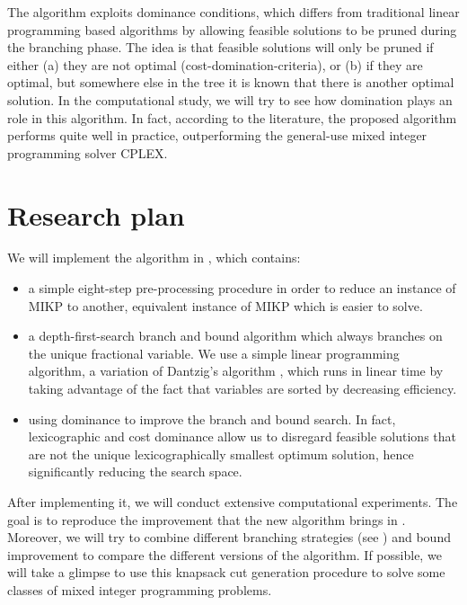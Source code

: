 \documentclass[a4paper,11pt]{article}
\begin{document}
The algorithm exploits dominance conditions, which differs from traditional linear programming based algorithms by allowing feasible 
solutions to be pruned during the branching phase. The idea is that feasible solutions will only be pruned if either (a) they are not 
optimal (cost-domination-criteria), or (b) if they are optimal, but somewhere else in the tree it is known that there is another optimal 
solution. In the computational study, we will try to see how  domination plays an role in this algorithm. In fact, according to the literature, the 
proposed algorithm performs quite well in practice, outperforming the general-use mixed integer programming solver CPLEX. 


\section{Research plan}
We will implement the algorithm in \cite{fukasawa2011exact}, which contains:
\begin{itemize}
\item a simple eight-step pre-processing procedure in order to reduce an instance of MIKP to another, equivalent
instance of MIKP which is easier to solve.
\item a depth-first-search branch and bound algorithm which always branches on the unique fractional variable. We use a simple 
linear programming algorithm, a variation of Dantzig’s algorithm \cite{dantzig1957discrete}, which runs in linear time by taking advantage 
of the fact that variables are sorted by decreasing efficiency.
\item using dominance to improve the branch and bound search. In fact, lexicographic and cost dominance allow us to disregard feasible 
solutions that are not the unique lexicographically smallest optimum solution, hence significantly reducing the search space.
\end{itemize}
After implementing it, we will conduct extensive computational experiments. The goal is to reproduce the improvement that the new algorithm 
brings in \cite{fukasawa2011exact}. Moreover, we will try to combine different branching strategies (see \cite{linderoth2005noncommercial}) and 
bound improvement to compare the different versions of the algorithm. If possible, we will take a glimpse to use this knapsack cut generation 
procedure to solve some classes of mixed integer programming problems.
\fi

 

 
\end{document}
